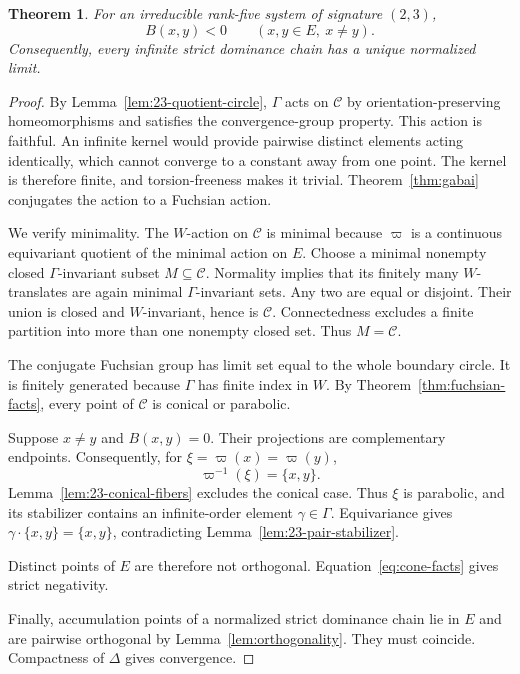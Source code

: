 \documentclass[11pt,reqno]{amsart}
\theoremstyle{plain}
\newtheorem{theorem}{Theorem}[section]
\theoremstyle{definition}
\theoremstyle{remark}
\numberwithin{equation}{section}
\begin{document}
\begin{theorem}\label{thm:signature-23}
For an irreducible rank-five system of signature $(2,3)$,
\[
B(x,y)<0\qquad(x,y\in E,\ x\neq y).
\]
Consequently, every infinite strict dominance chain has a unique normalized limit.
\end{theorem}
\begin{proof}
By Lemma~\ref{lem:23-quotient-circle}, $\Gamma$ acts on $\mathcal C$ by orientation-preserving homeomorphisms and satisfies the convergence-group property. This action is faithful. An infinite kernel would provide pairwise distinct elements acting identically, which cannot converge to a constant away from one point. The kernel is therefore finite, and torsion-freeness makes it trivial. Theorem~\ref{thm:gabai} conjugates the action to a Fuchsian action.

We verify minimality. The $W$-action on $\mathcal C$ is minimal because $\varpi$ is a continuous equivariant quotient of the minimal action on $E$. Choose a minimal nonempty closed $\Gamma$-invariant subset $M\subseteq\mathcal C$. Normality implies that its finitely many $W$-translates are again minimal $\Gamma$-invariant sets. Any two are equal or disjoint. Their union is closed and $W$-invariant, hence is $\mathcal C$. Connectedness excludes a finite partition into more than one nonempty closed set. Thus $M=\mathcal C$.

The conjugate Fuchsian group has limit set equal to the whole boundary circle. It is finitely generated because $\Gamma$ has finite index in $W$. By Theorem~\ref{thm:fuchsian-facts}, every point of $\mathcal C$ is conical or parabolic.

Suppose $x\neq y$ and $B(x,y)=0$. Their projections are complementary endpoints. Consequently, for $\xi=\varpi(x)=\varpi(y)$,
\[
\varpi^{-1}(\xi)=\{x,y\}.
\]
Lemma~\ref{lem:23-conical-fibers} excludes the conical case. Thus $\xi$ is parabolic, and its stabilizer contains an infinite-order element $\gamma\in\Gamma$. Equivariance gives $\gamma\cdot\{x,y\}=\{x,y\}$, contradicting Lemma~\ref{lem:23-pair-stabilizer}.

Distinct points of $E$ are therefore not orthogonal. Equation~\eqref{eq:cone-facts} gives strict negativity.

Finally, accumulation points of a normalized strict dominance chain lie in $E$ and are pairwise orthogonal by Lemma~\ref{lem:orthogonality}. They must coincide. Compactness of $\Delta$ gives convergence.
\end{proof}
\end{document}
